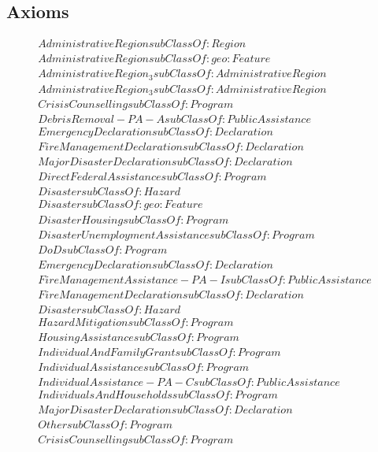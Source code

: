 \subsection{Axioms}
\begin{align}
  AdministrativeRegion subClassOf: Region\\
  AdministrativeRegion subClassOf: geo:Feature\\
  AdministrativeRegion_3 subClassOf: AdministrativeRegion\\
  AdministrativeRegion_3 subClassOf: AdministrativeRegion\\
  CrisisCounselling subClassOf: Program\\
  DebrisRemoval-PA-A subClassOf: PublicAssistance\\
  EmergencyDeclaration subClassOf: Declaration\\
  FireManagementDeclaration subClassOf: Declaration\\
  MajorDisasterDeclaration subClassOf: Declaration\\
  DirectFederalAssistance subClassOf: Program\\
  Disaster subClassOf: Hazard\\
  Disaster subClassOf: geo:Feature\\
  DisasterHousing subClassOf: Program\\
  DisasterUnemploymentAssistance subClassOf: Program\\
  DoD subClassOf: Program\\
  EmergencyDeclaration subClassOf: Declaration\\
  FireManagementAssistance-PA-I subClassOf: PublicAssistance\\
  FireManagementDeclaration subClassOf: Declaration\\
  Disaster subClassOf: Hazard\\
  HazardMitigation subClassOf: Program\\
  HousingAssistance subClassOf: Program\\
  IndividualAndFamilyGrant subClassOf: Program\\
  IndividualAssistance subClassOf: Program\\
  IndividualAssistance-PA-C subClassOf: PublicAssistance\\
  IndividualsAndHouseholds subClassOf: Program\\
  MajorDisasterDeclaration subClassOf: Declaration\\
  Other subClassOf: Program\\
  CrisisCounselling subClassOf: Program\\

\end{align}

